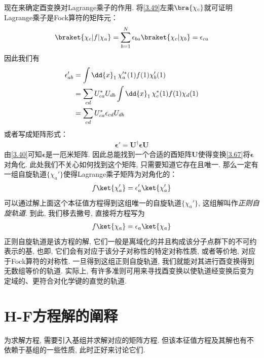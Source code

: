 现在来确定酉变换对Lagrange乘子的作用. 
将\autoref{3.49}左乘$\bra{\chi_c}$就可证明Lagrange乘子是Fock算符的矩阵元：
\begin{align}
	\braket{\chi_c|f|\chi_a} = \sum_{b=1}^{N}\epsilon_{ba}\braket{\chi_c|\chi_b} = \epsilon_{ca}
\end{align}
因此我们有
\begin{align}
	\epsilon_{ab}' & = \int\dd{x}_1\,\chi_a^{\prime *}(1)f(1)\chi_b'(1)\notag\\
	& = \sum_{cd}U_{ca}^* U_{db}\int\dd{x}_1\,\chi_c^*(1)f(1)\chi_d(1)\notag\\
	& = \sum_{cd}U_{ca}^* \epsilon_{cd} U_{db}
\end{align}
或者写成矩阵形式：
\begin{align}
	\label{3.67}
	\bm{\epsilon}' = \mathbf{U}^\dagger \bm{\epsilon}\mathbf{U}
\end{align}
由\autoref{3.40}可知$\bm{\epsilon}$是一厄米矩阵. 
因此总能找到一个合适的酉矩阵$\mathbf{U}$使得变换\autoref{3.67}将$\bm{\epsilon}$对角化. 
此处我们不关心如何找到这个矩阵, 
只需要知道它存在且唯一. 
那么一定有一组自旋轨道$\{\chi_a'\}$使得Lagrange乘子矩阵为对角化的：
\begin{align}
	f\ket{\chi_a'} = \epsilon_a'\ket{\chi_a'}
\end{align}
可以通过解上面这个本征值方程得到这组唯一的自旋轨道$\{\chi_a'\}$, 
这组解叫作\emph{正则自旋轨道}. 
到此, 
我们移去撇号, 
直接将\hft 方程写为
\begin{align}
	f\ket{\chi_a} = \epsilon_a\ket{\chi_a}
\end{align}
正则自旋轨道是该方程的解, 
它们一般是离域化的并且构成该分子点群下的不可约表示的基, 
也即, 
它们会有对应于该分子对称性的特定对称性质, 
或者等价地, 
对应于Fock算符的对称性. 
一旦得到这组正则自旋轨道, 
我们就能对其进行酉变换得到无数组等价的轨道. 
实际上, 
有许多准则可用来寻找酉变换以使轨道经变换后变为定域的、更符合对化学键的直觉的轨道.

\section{H-F方程解的阐释}
为求解\hft 方程, 
需要引入基组并求解对应的矩阵方程. 
但该本征值方程及其解也有不依赖于基组的一些性质, 
此时正好来讨论它们.

